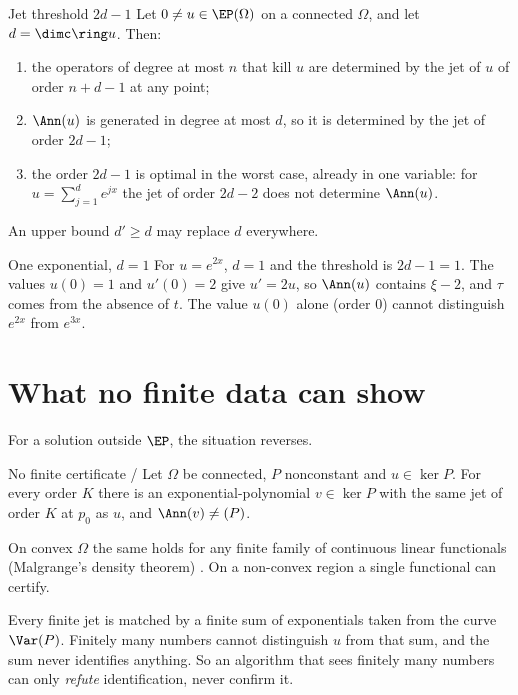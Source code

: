 \begin{theorem}{Jet threshold $2d-1$  \proved}\label{thm:jet-threshold}
Let $0\ne u\in\EP(\Omega)$ on a connected $\Omega$, and let $d=\dimc\ring u$. Then:
\begin{enumerate}[label=(\roman*)]
\item the operators of degree at most $n$ that kill $u$ are determined by the jet of $u$ of order $n+d-1$ at any point;
\item $\Ann(u)$ is generated in degree at most $d$, so it is determined by the jet of order $2d-1$;
\item the order $2d-1$ is optimal in the worst case, already in one variable: for $u=\sum_{j=1}^de^{jx}$ the jet of order $2d-2$ does not determine $\Ann(u)$.
\end{enumerate}
An upper bound $d'\ge d$ may replace $d$ everywhere.

\end{theorem}

\begin{example}{One exponential, $d=1$}
For $u=e^{2x}$, $d=1$ and the threshold is $2d-1=1$. The values $u(0)=1$ and $u'(0)=2$ give $u'=2u$, so $\Ann(u)$ contains $\xi-2$, and $\tau$ comes from the absence of $t$. The value $u(0)$ alone (order $0$) cannot distinguish $e^{2x}$ from $e^{3x}$.
\end{example}

\section{What no finite data can show}

For a solution outside $\EP$, the situation reverses.

\begin{theorem}{No finite certificate  \proved{} / \cf}\label{thm:nocert}
Let $\Omega$ be connected, $P$ nonconstant and $u\in\ker P$. For every order $K$ there is an exponential-polynomial $v\in\ker P$ with the same jet of order $K$ at $p_0$ as $u$, and $\Ann(v)\ne(P)$.

On convex $\Omega$ the same holds for any finite family of continuous linear functionals (Malgrange's density theorem) \cf. On a non-convex region a single functional can certify.

\end{theorem}

\begin{intuition}
Every finite jet is matched by a finite sum of exponentials taken from the curve $\Var(P)$. Finitely many numbers cannot distinguish $u$ from that sum, and the sum never identifies anything. So an algorithm that sees finitely many numbers can only \emph{refute} identification, never confirm it.
\end{intuition}

